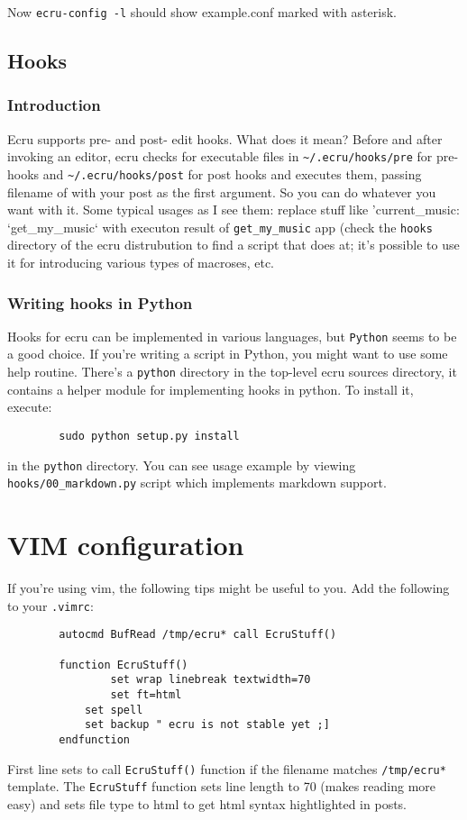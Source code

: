 \documentclass{article}
\begin{document}
	Now {\tt ecru-config -l} should show example.conf marked with asterisk.
      \subsection{Hooks}
	\subsubsection{Introduction}
        Ecru supports pre- and post- edit hooks. What does it mean? Before and after invoking an editor,
	ecru checks for executable files in {\tt \verb+~+/.ecru/hooks/pre} for pre- hooks and
	{\tt \verb+~+/.ecru/hooks/post} for post hooks and executes them, passing filename of with your
	post as the first argument. So you can do whatever you want with it. Some typical usages as
	I see them: replace stuff like 'current\_music: `get\_my\_music` with executon result of 
	{\tt get\_my\_music} app (check the {\tt hooks} directory of the ecru distrubution to find
	a script that does at; it's possible to use it for introducing various types of macroses, etc.
	\subsubsection{Writing hooks in Python}
	Hooks for ecru can be implemented in various languages, but {\tt Python} seems to be a good choice.
	If you're writing a script in Python, you might want to use some help routine.  There's a 
	{\tt python} directory in the top-level ecru sources directory, it contains a helper module for 
	implementing hooks in python. To install it, execute:

	\begin{verbatim}
		sudo python setup.py install
	\end{verbatim}

	in the {\tt python} directory. You can see usage example by viewing {\tt hooks/00\_markdown.py} script
	which implements markdown support.
     \section{VIM configuration}
        If you're using vim, the following tips might be useful to you. Add the following to your {\tt .vimrc}:
        \begin{verbatim}
		autocmd BufRead /tmp/ecru* call EcruStuff()

		function EcruStuff()
		        set wrap linebreak textwidth=70
		        set ft=html
			set spell
			set backup " ecru is not stable yet ;]
		endfunction
	\end{verbatim}

	First line sets to call {\tt EcruStuff()} function if the filename matches {\tt /tmp/ecru*} template.
	The {\tt EcruStuff} function sets line length to 70 (makes reading more easy) and sets file type to
	html to get html syntax hightlighted in posts.
\end{document}
